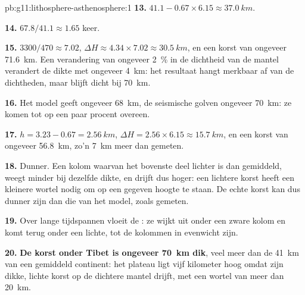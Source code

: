 \begin{solution}{pb:g11:lithosphere-asthenosphere:1}
\textbf{13.} $41.1 - 0.67 \times 6.15 \approx \qty{37.0}{km}$.

\textbf{14.} $67.8/41.1 \approx 1.65$ keer.

\textbf{15.} $3300/470 \approx 7.02$, $\Delta H \approx 4.34 \times 7.02
\approx \qty{30.5}{km}$, en een korst van ongeveer \qty{71.6}{km}. Een verandering
van ongeveer \qty{2}{\percent} in de dichtheid van de mantel verandert de dikte met
ongeveer \qty{4}{km}: het resultaat hangt merkbaar af van de dichtheden, maar blijft
dicht bij \qty{70}{km}.

\textbf{16.} Het model geeft ongeveer \qty{68}{km}, de seismische golven ongeveer
\qty{70}{km}: ze komen tot op een paar procent overeen.

\textbf{17.} $h = 3.23 - 0.67 = \qty{2.56}{km}$, $\Delta H = 2.56 \times
6.15 \approx \qty{15.7}{km}$, en een korst van ongeveer \qty{56.8}{km}, zo'n
\qty{7}{km} meer dan gemeten.

\textbf{18.} Dunner. Een kolom waarvan het bovenste deel lichter is dan gemiddeld,
weegt minder bij dezelfde dikte, en drijft dus hoger: een lichtere korst heeft
een kleinere wortel nodig om op een gegeven hoogte te staan. De echte korst kan
dus dunner zijn dan die van het model, zoals gemeten.

\textbf{19.} Over lange tijdspannen vloeit de : ze wijkt uit onder
een zware kolom en komt terug onder een lichte, tot de kolommen in evenwicht zijn.

\textbf{20.} \textbf{De korst onder Tibet is ongeveer \qty{70}{km} dik}, veel
meer dan de \qty{41}{km} van een gemiddeld continent: het plateau ligt vijf
kilometer hoog omdat zijn dikke, lichte korst op de dichtere mantel drijft,
met een wortel van meer dan \qty{20}{km}.
\end{solution}
